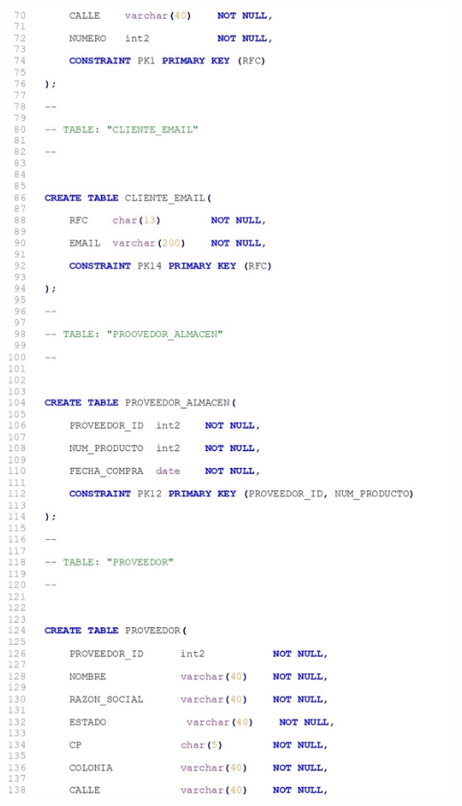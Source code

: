 \documentclass[letter,12pt]{article} %
\begin{document}
\includegraphics[scale=0.85]{imagenes/DDL2.jpg}
\newpage
\end{document}
